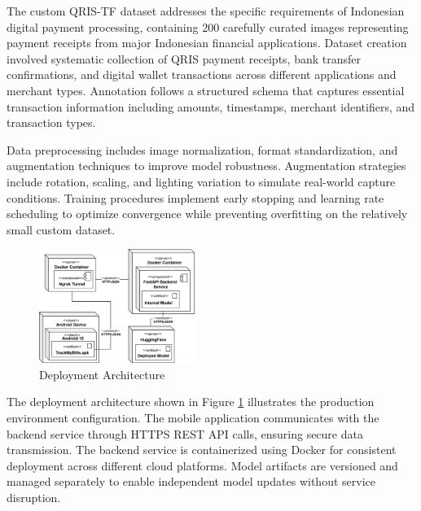 The custom QRIS-TF dataset addresses the specific requirements of Indonesian digital payment processing, containing 200 carefully curated images representing payment receipts from major Indonesian financial applications. Dataset creation involved systematic collection of QRIS payment receipts, bank transfer confirmations, and digital wallet transactions across different applications and merchant types. Annotation follows a structured schema that captures essential transaction information including amounts, timestamps, merchant identifiers, and transaction types.

Data preprocessing includes image normalization, format standardization, and augmentation techniques to improve model robustness. Augmentation strategies include rotation, scaling, and lighting variation to simulate real-world capture conditions. Training procedures implement early stopping and learning rate scheduling to optimize convergence while preventing overfitting on the relatively small custom dataset.

\begin{figure}[htbp]
    \centerline{\includegraphics[width=0.45\textwidth]{images/deployment-diagram.png}}
    \caption{Deployment Architecture}
    \label{fig:deployment}
\end{figure}

The deployment architecture shown in Figure \ref{fig:deployment} illustrates the production environment configuration. The mobile application communicates with the backend service through HTTPS REST API calls, ensuring secure data transmission. The backend service is containerized using Docker for consistent deployment across different cloud platforms. Model artifacts are versioned and managed separately to enable independent model updates without service disruption.